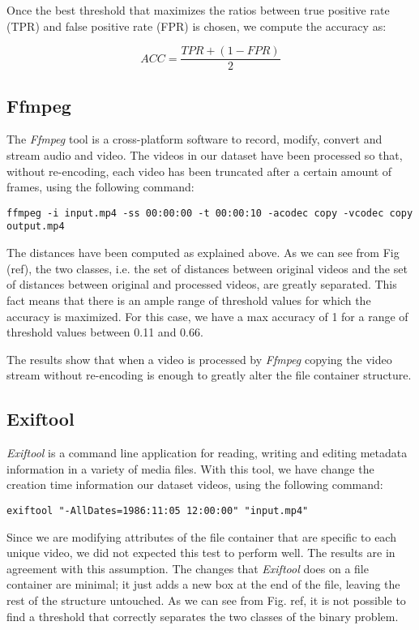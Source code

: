 Once the best threshold that maximizes the ratios between true positive rate (TPR) and false positive rate (FPR) is chosen, we compute the accuracy as:

$$  ACC = \dfrac{TPR + (1 - FPR)}{2} $$

\subsection{Ffmpeg}

The \emph{Ffmpeg} tool is a cross-platform software to record, modify, convert and stream audio and video. The videos in our dataset have been processed so that, without re-encoding, each video has been truncated after a certain amount of frames, using the following command:

\begin{lstlisting}
ffmpeg -i input.mp4 -ss 00:00:00 -t 00:00:10 -acodec copy -vcodec copy output.mp4
\end{lstlisting}

The distances have been computed as explained above. As we can see from Fig (ref), the two classes, i.e. the set of distances between original videos and the set of distances between original and processed videos, are greatly separated. This fact means that there is an ample range of threshold values for which the accuracy is maximized. For this case, we have a max accuracy of 1 for a range of threshold values between 0.11 and 0.66.

The results show that when a video is processed by \emph{Ffmpeg} copying the video stream without re-encoding is enough to greatly alter the file container structure.


\subsection{Exiftool}

\emph{Exiftool} is a command line application for reading, writing and editing metadata information in a variety of media files. With this tool, we have change the creation time information our dataset videos, using the following command:

\begin{lstlisting}
exiftool "-AllDates=1986:11:05 12:00:00" "input.mp4"
\end{lstlisting}

Since we are modifying attributes of the file container that are specific to each unique video, we did not expected this test to perform well. The results are in agreement with this assumption. The changes that \emph{Exiftool} does on a file container are minimal; it just adds a new box at the end of the file, leaving the rest of the structure untouched. As we can see from Fig. ref, it is not possible to find a threshold that correctly separates the two classes of the binary problem.

